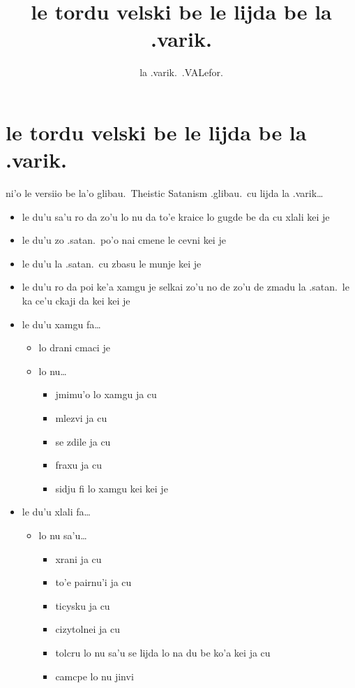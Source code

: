 \documentclass{article}
\title{le tordu velski be le lijda be la .varik.}
\author{la .varik.\ .VALefor.}
\begin{document}
\maketitle

\section{le tordu velski be le lijda be la .varik.}

ni'o le versiio be la'o glibau.\ Theistic Satanism .glibau.\ cu lijda la .varik\ldots

\begin{itemize}
	\item le du'u sa'u ro da zo'u lo nu da to'e kraice lo gugde be da cu xlali kei je
	\item le du'u zo .satan.\ po'o nai cmene le cevni kei je
	\item le du'u la .satan.\ cu zbasu le munje kei je
	\item le du'u ro da poi ke'a xamgu je selkai zo'u no de zo'u de zmadu la .satan.\ le ka ce'u ckaji da kei kei je
	\item le du'u xamgu fa\ldots{}
	\begin{itemize}
		\item lo drani cmaci je
		\item lo nu\ldots{}
		\begin{itemize}
			\item jmimu'o lo xamgu ja cu
			\item mlezvi ja cu
			\item se zdile ja cu
			\item fraxu ja cu
			\item sidju fi lo xamgu kei kei je
		\end{itemize}
	\end{itemize}
	\item le du'u xlali fa\ldots{}
	\begin{itemize}
		\item lo nu sa'u\ldots{}
		\begin{itemize}
			\item xrani ja cu
			\item to'e pairnu'i ja cu
			\item ticysku ja cu
			\item cizytolnei ja cu
			\item tolcru lo nu sa'u se lijda lo na du be ko'a kei ja cu
			\item camcpe lo nu jinvi
		\end{itemize}
	\end{itemize}
\end{itemize}
\end{document}
